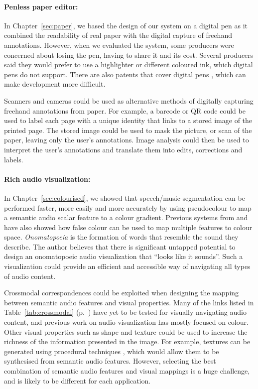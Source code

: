 \paragraph{Penless paper editor:}

In Chapter~\ref{sec:paper}, we based the design of our system on a digital pen as it combined the readability of real
paper with the digital capture of freehand annotations. However, when we evaluated the system, some producers were
concerned about losing the pen, having to share it and its cost. Several producers said they would prefer to use a
highlighter or different coloured ink, which digital pens do not support. There are also patents that cover digital
pens \citep{Fahraeus2003}, which can make development more difficult.

Scanners and cameras could be used as alternative methods of digitally capturing freehand annotations from paper.  For
example, a barcode or QR code could be used to label each page with a unique identity that links to a stored image of
the printed page. The stored image could be used to mask the picture, or scan of the paper, leaving only the user's
annotations. Image analysis could then be used to interpret the user's annotations and translate them into edits,
corrections and labels.

\paragraph{Rich audio visualization:}

In Chapter~\ref{sec:colourised}, we showed that speech/music segmentation can be performed faster, more easily and more
accurately by using pseudocolour to map a semantic audio scalar feature to a colour gradient. Previous systems from
\citet{Tzanetakis2000} and \citet{Mason2007} have also showed how false colour can be used to map multiple features to
colour space.  \textit{Onomatopoeia} is the formation of words that resemble the sound they describe.  The author
believes that there is significant untapped potential to design an onomatopoeic audio visualization that ``looks like
it sounds''.  Such a visualization could provide an efficient and accessible way of navigating all types of audio
content.

Crossmodal correspondences could be exploited when designing the mapping between semantic audio features and visual
properties.  Many of the links listed in Table~\ref{tab:crossmodal} (p.~\pageref{tab:crossmodal}) have yet to be tested
for visually navigating audio content, and previous work on audio visualization has mostly focused on colour.  Other
visual properties such as shape and texture could be used to increase the richness of the information presented in the
image.  For example, textures can be generated using procedural techniques \citep{Ebert1994}, which would allow them to
be synthesised from semantic audio features.  However, selecting the best combination of semantic audio features and
visual mappings is a huge challenge, and is likely to be different for each application.



